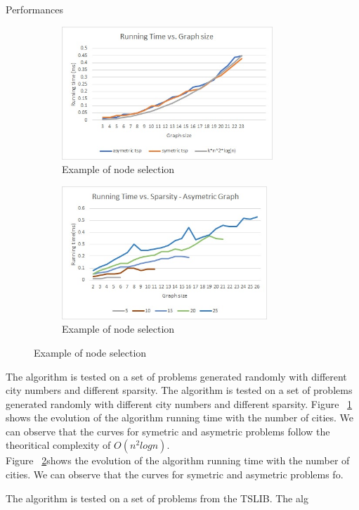 \documentclass[../report.tex]{subfiles}
\begin{document}
\begin{subsection}{Performances}


\begin{figure}[H]
\centering
\begin{subfigure}{.5\textwidth}
\includegraphics[height=5cm,valign=t]{Images/perf_random_graphsize.jpg}
\caption{Example of node selection \label{fig:randomgraphsize}}
\end{subfigure}%
\begin{subfigure}{.5\textwidth}
\includegraphics[height=5cm,valign=t]{Images/perf_random_sparsity.jpg}
\caption{Example of node selection \label{fig:randomsparsity}}
\end{subfigure}%
\caption{Example of node selection \label{fig:randomperf}}
\end{figure}

The algorithm is tested on a set of problems generated randomly with different city numbers and different sparsity.
The algorithm is tested on a set of problems generated randomly with different city numbers and different sparsity.
Figure ~\ref{fig:randomgraphsize} shows the evolution of the algorithm running time with the number of cities. We can observe that the curves for symetric and asymetric problems follow the theoritical complexity of $O(n^2 log n)$. \\
Figure ~\ref{fig:randomsparsity}shows the evolution of the algorithm running time with the number of cities. We can observe that the curves for symetric and asymetric problems fo.



The algorithm is tested on a set of problems from the TSLIB.
The alg

\end{subsection}
\end{document}
